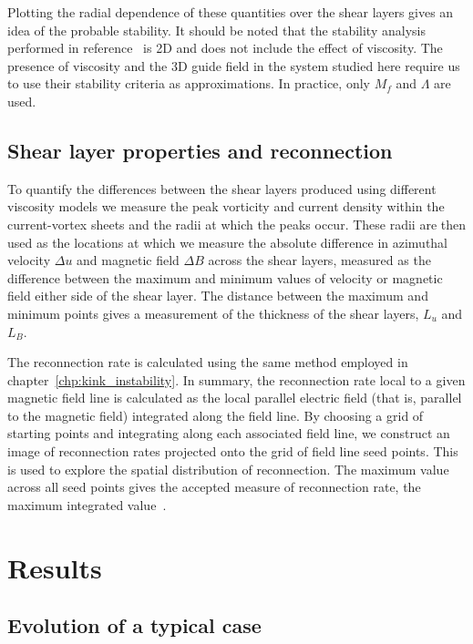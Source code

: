 Plotting the radial dependence of these quantities over the shear layers gives an idea of the probable stability. It should be noted that the stability analysis performed in reference~\cite{einaudiResistiveInstabilitiesFlowing1986} is 2D and does not include the effect of viscosity. The presence of viscosity and the 3D guide field in the system studied here require us to use their stability criteria as approximations. In practice, only $M_f$ and $\Lambda$ are used.

\subsection{Shear layer properties and reconnection}

To quantify the differences between the shear layers produced using different viscosity models we measure the peak vorticity and current density within the current-vortex sheets and the radii at which the peaks occur. These radii are then used as the locations at which we measure the absolute difference in azimuthal velocity $\Delta u$ and magnetic field $\Delta B$ across the shear layers, measured as the difference between the maximum and minimum values of velocity or magnetic field either side of the shear layer. The distance between the maximum and minimum points gives a measurement of the thickness of the shear layers, $L_u$ and $L_B$.

The reconnection rate is calculated using the same method employed in chapter~\ref{chp:kink_instability}. In summary, the reconnection rate local to a given magnetic field line is calculated as the local parallel electric field (that is, parallel to the magnetic field) integrated along the field line. By choosing a grid of starting points and integrating along each associated field line, we construct an image of reconnection rates projected onto the grid of field line seed points. This is used to explore the spatial distribution of reconnection. The maximum value across all seed points gives the accepted measure of reconnection rate, the maximum integrated value~\cite{galsgaardSteadyStateReconnection2011,priestNatureThreedimensionalMagnetic2003,schindlerGeneralMagneticReconnection1988}.

\section{Results}

\label{sec:khi_results}

\subsection{Evolution of a typical case}
\label{sec:null_point_khi_single_case}

